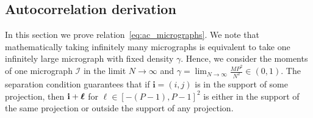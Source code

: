 \documentclass[12pt]{article}
\newcommand{\1}{\mathbf{1}}
\newcommand{\II}{\mathcal{I}}
\newcommand{\mb}{\mathbf}
\newcommand*\Bell{\ensuremath{\boldsymbol\ell}}
\theoremstyle{plain}
\theoremstyle{definition}
\theoremstyle{remark}
\theoremstyle{plain}
\theoremstyle{remark}
\theoremstyle{plain}
\theoremstyle{plain}
\begin{document}
\subsection{Autocorrelation derivation} \label{sec:moment_derivation}

In this section we prove relation~\eqref{eq:ac_micrographs}. We note that mathematically taking infinitely many micrographs is equivalent to take one infinitely large micrograph with fixed density $\gamma$. Hence, we consider the moments of one micrograph $\II$ in the limit $N\to\infty$ and  $\gamma = \lim_{N\to\infty}\frac{MP^2}{N^2}\in(0,1)$. 
The separation condition guarantees that if $\mb i=(i,j)$ is in the support of some projection, then $\mb i + \mb \Bell$ for $\Bell\in[-(P-1),P-1]^2$ is either in the support of the same projection or outside the support of any projection. 
\end{document}
